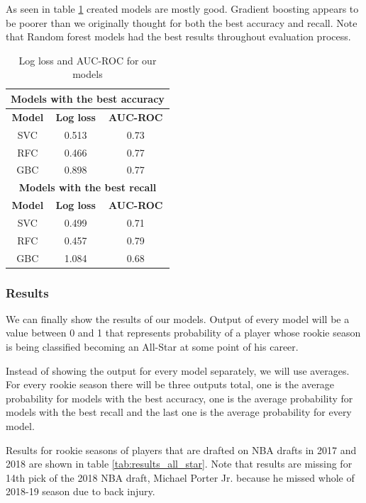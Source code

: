 \documentclass[a4paper]{article}
\begin{document}
As seen in table \ref{tab:aucroc_logloss_all_star} created models are mostly good. Gradient boosting appears to be poorer than we originally thought for both the best accuracy and recall. Note that Random forest models had the best results throughout evaluation process.

\begin{table}[!h]
\begin{center}
\begin{tabular}{|c|c|c|} \hline
\multicolumn{3}{|c|}{\textbf{Models with the best accuracy}} \\ \hline
\textbf{Model} & \textbf{Log loss} & \textbf{AUC-ROC} \\ \hline
SVC & 0.513 & 0.73 \\ \hline
RFC & 0.466 & 0.77 \\ \hline
GBC & 0.898 & 0.77 \\ \hline
\multicolumn{3}{|c|}{\textbf{Models with the best recall}} \\ \hline
\textbf{Model} & \textbf{Log loss} & \textbf{AUC-ROC} \\ \hline
SVC & 0.499 & 0.71 \\ \hline
RFC & 0.457 & 0.79 \\ \hline
GBC & 1.084 & 0.68 \\ \hline
\end{tabular}
\caption{Log loss and AUC-ROC for our models}
\label{tab:aucroc_logloss_all_star}
\end{center}
\end{table}

\subsubsection{Results}
\label{subsubsec:results_all_star}

We can finally show the results of our models. Output of every model will be a value between 0 and 1 that represents probability of a player whose rookie season is being classified becoming an All-Star at some point of his career. 

Instead of showing the output for every model separately, we will use averages. For every rookie season there will be three outputs total, one is the average probability for models with the best accuracy, one is the average probability for models with the best recall and the last one is the average probability for every model.

Results for rookie seasons of players that are drafted on NBA drafts in 2017 and 2018 are shown in table \ref{tab:results_all_star}. Note that results are missing for 14th pick of the 2018 NBA draft, Michael Porter Jr. because he missed whole of 2018-19 season due to back injury.
\end{document}
